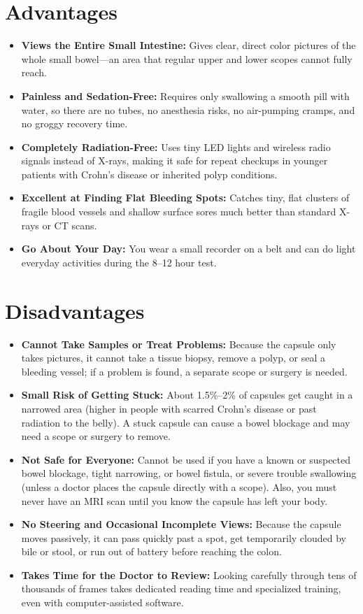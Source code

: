 \section{Advantages}
\begin{itemize}
    \item \textbf{Views the Entire Small Intestine:} Gives clear, direct color pictures of the whole small bowel---an area that regular upper and lower scopes cannot fully reach.
    \item \textbf{Painless and Sedation-Free:} Requires only swallowing a smooth pill with water, so there are no tubes, no anesthesia risks, no air-pumping cramps, and no groggy recovery time.
    \item \textbf{Completely Radiation-Free:} Uses tiny LED lights and wireless radio signals instead of X-rays, making it safe for repeat checkups in younger patients with Crohn's disease or inherited polyp conditions.
    \item \textbf{Excellent at Finding Flat Bleeding Spots:} Catches tiny, flat clusters of fragile blood vessels and shallow surface sores much better than standard X-rays or CT scans.
    \item \textbf{Go About Your Day:} You wear a small recorder on a belt and can do light everyday activities during the 8--12 hour test.
\end{itemize}

\section{Disadvantages}
\begin{itemize}
    \item \textbf{Cannot Take Samples or Treat Problems:} Because the capsule only takes pictures, it cannot take a tissue biopsy, remove a polyp, or seal a bleeding vessel; if a problem is found, a separate scope or surgery is needed.
    \item \textbf{Small Risk of Getting Stuck:} About 1.5\%--2\% of capsules get caught in a narrowed area (higher in people with scarred Crohn's disease or past radiation to the belly). A stuck capsule can cause a bowel blockage and may need a scope or surgery to remove.
    \item \textbf{Not Safe for Everyone:} Cannot be used if you have a known or suspected bowel blockage, tight narrowing, or bowel fistula, or severe trouble swallowing (unless a doctor places the capsule directly with a scope). Also, you must never have an MRI scan until you know the capsule has left your body.
    \item \textbf{No Steering and Occasional Incomplete Views:} Because the capsule moves passively, it can pass quickly past a spot, get temporarily clouded by bile or stool, or run out of battery before reaching the colon.
    \item \textbf{Takes Time for the Doctor to Review:} Looking carefully through tens of thousands of frames takes dedicated reading time and specialized training, even with computer-assisted software.
\end{itemize}

